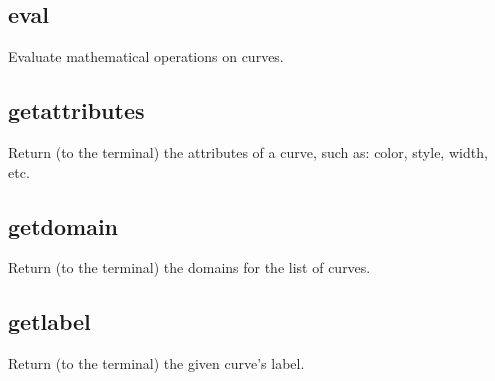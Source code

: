 \documentclass[letterpaper,10pt,english]{sphinxmanual}
\begin{document}
\begin{sphinxVerbatim}[commandchars=\\\{\}]
\PYG{p}{[}\PYG{p}{]}  
\end{sphinxVerbatim}


\subsection{eval}
\label{\detokenize{curve_inquiry_cmds:eval}}
Evaluate mathematical operations on curves.

\begin{sphinxVerbatim}[commandchars=\\\{\}]
\PYG{p}{[}\PYG{p}{]}  
\end{sphinxVerbatim}


\subsection{getattributes}
\label{\detokenize{curve_inquiry_cmds:getattributes}}
Return (to the terminal) the attributes of a curve, such as: color, style, width, etc.

\begin{sphinxVerbatim}[commandchars=\\\{\}]
\PYG{p}{[}\PYG{p}{]}  
\end{sphinxVerbatim}


\subsection{getdomain}
\label{\detokenize{curve_inquiry_cmds:getdomain}}
Return (to the terminal) the domains for the list of curves.

\begin{sphinxVerbatim}[commandchars=\\\{\}]
\PYG{p}{[}\PYG{p}{]}  
\end{sphinxVerbatim}


\subsection{getlabel}
\label{\detokenize{curve_inquiry_cmds:getlabel}}
Return (to the terminal) the given curve’s label.
\end{document}
